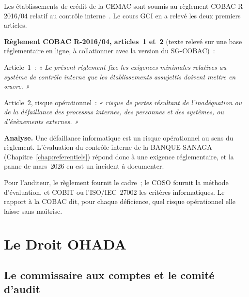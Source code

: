 Les établissements de crédit de la CEMAC sont soumis au règlement COBAC
R-2016/04 relatif au contrôle interne~\cite{cobac2016r04}. Le cours GCI en a
relevé les deux premiers articles.

\begin{boxjuris}
\textbf{Règlement COBAC R-2016/04, articles~1 et~2} (texte relevé sur une
base réglementaire en ligne, à collationner avec la version du
SG-COBAC)~:

\medskip
Article~1~: \textit{« Le présent règlement fixe les exigences minimales
relatives au système de contrôle interne que les établissements assujettis
doivent mettre en œuvre. »}

\medskip
Article~2, risque opérationnel~: \textit{« risque de pertes résultant de
l'inadéquation ou de la défaillance des processus internes, des personnes
et des systèmes, ou d'évènements externes. »}

\medskip
\textbf{Analyse.} Une défaillance informatique est un risque opérationnel
au sens du règlement. L'évaluation du contrôle interne de la BANQUE SANAGA
(Chapitre~\ref{chap:referentiels}) répond donc à une exigence
réglementaire, et la panne de mars~2026 en est un incident à documenter.
\end{boxjuris}

Pour l'auditeur, le règlement fournit le cadre~; le COSO fournit la
méthode d'évaluation, et COBIT ou l'ISO/IEC~27002 les critères
informatiques. Le rapport à la COBAC dit, pour chaque déficience, quel
risque opérationnel elle laisse sans maîtrise.

\section{Le Droit OHADA}
\label{sec:c15-ohada}

\subsection{Le commissaire aux comptes et le comité d'audit}


